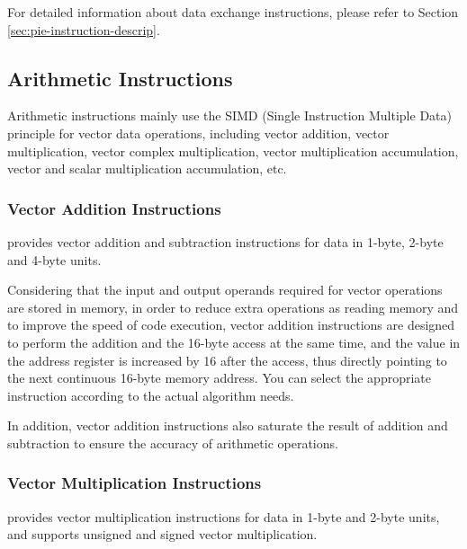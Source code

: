 \documentclass[main\_\_EN.tex]{subfiles}
\begin{document}
For detailed information about data exchange instructions, please refer to Section \ref{sec:pie-instruction-descrip}.





\subsection{Arithmetic Instructions}
\label{sec:pie-arithmetic-instructions}

Arithmetic instructions mainly use the SIMD (Single Instruction Multiple Data) principle for vector data operations, including vector addition, vector multiplication, vector complex multiplication, vector multiplication accumulation, vector and scalar multiplication accumulation, etc.

\subsubsection{Vector Addition Instructions}

\chipname{} provides vector addition and subtraction instructions for data in 1-byte, 2-byte and 4-byte units.

Considering that the input and output operands required for vector operations are stored in memory, in order to reduce extra operations as reading memory and to improve the speed of code execution, vector addition instructions are designed to perform the addition and the 16-byte access at the same time, and the value in the address register is increased by 16 after the access, thus directly pointing to the next continuous 16-byte memory address. You can select the appropriate instruction according to the actual algorithm needs.

In addition, vector addition instructions also saturate the result of addition and subtraction to ensure the accuracy of arithmetic operations.



\subsubsection{Vector Multiplication Instructions}

\chipname{} provides vector multiplication instructions for data in 1-byte and 2-byte units, and supports unsigned and signed vector multiplication.
\end{document}
